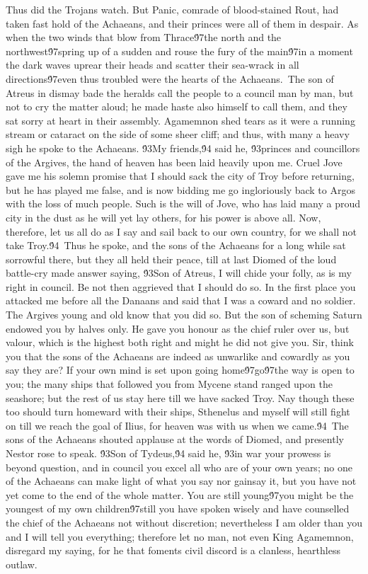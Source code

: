 {  Thus did the Trojans watch. But Panic, comrade of blood-stained Rout, had taken fast hold of the Achaeans, and their princes were all of them in despair. As when the two winds that blow from Thrace\'97the north and the northwest\'97spring up of a sudden and rouse the fury of the main\'97in a moment the dark waves uprear their heads and scatter their sea-wrack in all directions\'97even thus troubled were the hearts of the Achaeans.\
The son of Atreus in dismay bade the heralds call the people to a council man by man, but not to cry the matter aloud; he made haste also himself to call them, and they sat sorry at heart in their assembly. Agamemnon shed tears as it were a running stream or cataract on the side of some sheer cliff; and thus, with many a heavy sigh he spoke to the Achaeans. \'93My friends,\'94 said he, \'93princes and councillors of the Argives, the hand of heaven has been laid heavily upon me. Cruel Jove gave me his solemn promise that I should sack the city of Troy before returning, but he has played me false, and is now bidding me go ingloriously back to Argos with the loss of much people. Such is the will of Jove, who has laid many a proud city in the dust as he will yet lay others, for his power is above all. Now, therefore, let us all do as I say and sail back to our own country, for we shall not take Troy.\'94\
Thus he spoke, and the sons of the Achaeans for a long while sat sorrowful there, but they all held their peace, till at last Diomed of the loud battle-cry made answer saying, \'93Son of Atreus, I will chide your folly, as is my right in council. Be not then aggrieved that I should do so. In the first place you attacked me before all the Danaans and said that I was a coward and no soldier. The Argives young and old know that you did so. But the son of scheming Saturn endowed you by halves only. He gave you honour as the chief ruler over us, but valour, which is the highest both right and might he did not give you. Sir, think you that the sons of the Achaeans are indeed as unwarlike and cowardly as you say they are? If your own mind is set upon going home\'97go\'97the way is open to you; the many ships that followed you from Mycene stand ranged upon the seashore; but the rest of us stay here till we have sacked Troy. Nay though these too should turn homeward with their ships, Sthenelus and myself will still fight on till we reach the goal of Ilius, for heaven was with us when we came.\'94\
The sons of the Achaeans shouted applause at the words of Diomed, and presently Nestor rose to speak. \'93Son of Tydeus,\'94 said he, \'93in war your prowess is beyond question, and in council you excel all who are of your own years; no one of the Achaeans can make light of what you say nor gainsay it, but you have not yet come to the end of the whole matter. You are still young\'97you might be the youngest of my own children\'97still you have spoken wisely and have counselled the chief of the Achaeans not without discretion; nevertheless I am older than you and I will tell you everything; therefore let no man, not even King Agamemnon, disregard my saying, for he that foments civil discord is a clanless, hearthless outlaw.\
}
